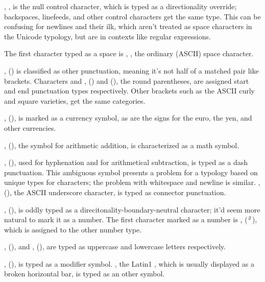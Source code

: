 , , is the null control
character, which is typed as a directionality override; backspaces,
linefeeds, and other control characters get the same type.  This can
be confusing for newlines and their ilk, which aren't treated as space
characters in the Unicode typology, but are in contexts like regular
expressions.  

The first character typed as a space is ,
, the ordinary (ASCII) space character.

,  (\charmention{!}) is
classified as other punctuation, meaning it's not half of a matched
pair like brackets.  Characters  and ,
 (\charmention{(}) and
 (\charmention{)}), the round
parentheses, are assigned start and end punctuation types
respectively.  Other brackets such as the ASCII curly and square
varieties, get the same categories.

,  (\charmention{\$}), is
marked as a currency symbol, as are the signs for the euro, the yen,
and other currencies.  

,  (\charmention{+}), the symbol
for arithmetic addition, is characterized as a math symbol.

,  (\charmention{-}), used for
hyphenation and for arithmetical subtraction, is typed as a dash
punctuation.  This ambiguous symbol presents a problem for a typology
based on unique types for characters; the problem with whitespace and
newline is similar.  , 
(\charmention{\_}), the ASCII underscore character, is typed as
connector punctuation.

,  (), is oddly
typed as a direcitonality-boundary-neutral character; it'd seem more
natural to mark it as a number.  The first character marked as a
number is , 
(${}^{\rm\small {\it 2}}$), which is assigned to the other
number type.

, 
(), and ,  (), are typed as uppercase and lowercase letters
respectively.  

,  (\charmention{\^{}}),
is typed as a modifier symbol.  , the Latin1
, which is usually displayed as a broken
horizontal bar, is typed as an other symbol.

